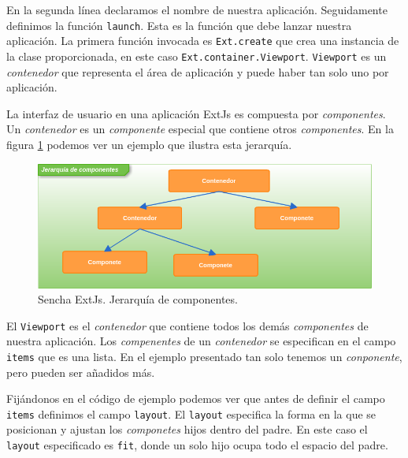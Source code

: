  	\par
	En la segunda línea declaramos el nombre de nuestra aplicación. Seguidamente definimos la función \texttt{launch}. Esta es la función que debe
	lanzar  nuestra aplicación. La primera función invocada es \texttt{Ext.create} que crea una instancia de la clase proporcionada, en este caso
	\texttt{Ext.container.Viewport}. \texttt{Viewport} es un \emph{contenedor} que representa el área de aplicación y puede haber tan solo uno por
	aplicación. 
 	\par
	La interfaz de usuario en una aplicación ExtJs es compuesta por \emph{componentes}. Un \emph{contenedor} es un \emph{componente} especial que
	contiene otros \emph{componentes}. En la figura \ref{fig:comps} podemos ver un ejemplo que ilustra esta jerarquía.
	\begin{figure}[h]
		\centering
		\includegraphics[keepaspectratio, width=1\textwidth]{./img/comps.png}
		\caption{Sencha ExtJs. Jerarquía de componentes.}   
		\label{fig:comps}
	\end{figure}
 	\par
	El \texttt{Viewport} es el \emph{contenedor} que contiene todos los demás \emph{componentes} de nuestra aplicación. Los \emph{compenentes} de
	un \emph{contenedor} se especifican en el campo \texttt{items} que es una lista. En el ejemplo presentado tan solo tenemos un
	\emph{conponente}, pero pueden ser añadidos más.
 	\par
	Fijándonos en el código de ejemplo podemos ver que antes de definir el campo \texttt{items} definimos el campo \texttt{layout}. El
	\texttt{layout} especifica la forma en la que se posicionan y ajustan los \emph{componetes} hijos dentro del padre. En este caso el
	\texttt{layout} especificado es \texttt{\cc fit\cc}, donde un solo hijo ocupa todo el espacio del padre.
